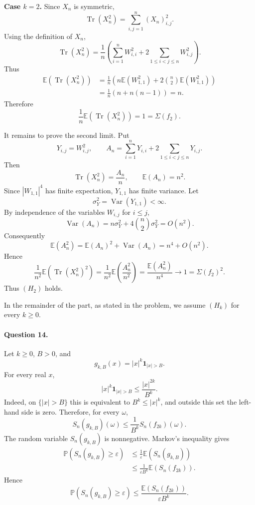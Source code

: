 \documentclass[11pt,a4paper]{article}
\newcommand{\E}{\mathbb{E}}
\newcommand{\Prob}{\mathbb{P}}
\newcommand{\one}{\mathbf{1}}
\DeclareMathOperator{\Tr}{Tr}
\begin{document}
\medskip
\noindent\textbf{Case $k=2$.}  Since $X_n$ is symmetric,
\[
  \Tr(X_n^2)=\sum_{i,j=1}^n (X_n)_{i,j}^2.
\]
Using the definition of $X_n$,
\[
  \Tr(X_n^2)
  =\frac1n\left(\sum_{i=1}^n W_{i,i}^2
  +2\sum_{1\le i<j\le n}W_{i,j}^2\right).
\]
Thus
\[
\begin{aligned}
 \E(\Tr(X_n^2))
 &=\frac1n\left(n\E(W_{1,1}^2)+2\binom n2\E(W_{1,1}^2)\right)\\
 &=\frac1n\left(n+n(n-1)\right)=n.
\end{aligned}
\]
Therefore
\[
  \frac1n\E(\Tr(X_n^2))=1=\Sigma(f_2).
\]

It remains to prove the second limit.  Put
\[
  Y_{i,j}=W_{i,j}^2,
  \qquad
  A_n=\sum_{i=1}^nY_{i,i}+2\sum_{1\le i<j\le n}Y_{i,j}.
\]
Then
\[
  \Tr(X_n^2)=\frac{A_n}{n},
  \qquad
  \E(A_n)=n^2.
\]
Since $|W_{1,1}|^4$ has finite expectation, $Y_{1,1}$ has finite variance.  Let
\[
  \sigma_Y^2=\operatorname{Var}(Y_{1,1})<\infty.
\]
By independence of the variables $W_{i,j}$ for $i\le j$,
\[
  \operatorname{Var}(A_n)
  =n\sigma_Y^2+4\binom n2\sigma_Y^2
  =O(n^2).
\]
Consequently
\[
  \E(A_n^2)=\E(A_n)^2+\operatorname{Var}(A_n)=n^4+O(n^2).
\]
Hence
\[
  \frac1{n^2}\E(\Tr(X_n^2)^2)
  =\frac1{n^2}\E\left(\frac{A_n^2}{n^2}\right)
  =\frac{\E(A_n^2)}{n^4}
  \longrightarrow1=\Sigma(f_2)^2.
\]
Thus $(H_2)$ holds.

In the remainder of the part, as stated in the problem, we assume $(H_k)$ for every $k\ge0$.

\paragraph{Question 14.}
Let $k\ge0$, $B>0$, and
\[
  g_{k,B}(x)=|x|^k\one_{|x|>B}.
\]
For every real $x$,
\[
  |x|^k\one_{|x|>B}
  \le \frac{|x|^{2k}}{B^k}.
\]
Indeed, on $\{|x|>B\}$ this is equivalent to $B^k\le |x|^k$, and outside this set the left-hand side is zero.  Therefore, for every $\omega$,
\[
  S_n(g_{k,B})(\omega)
  \le \frac1{B^k}S_n(f_{2k})(\omega).
\]
The random variable $S_n(g_{k,B})$ is nonnegative.  Markov's inequality gives
\[
\begin{aligned}
 \Prob(S_n(g_{k,B})\ge\varepsilon)
 &\le \frac1\varepsilon\E(S_n(g_{k,B}))\\
 &\le \frac1{\varepsilon B^k}\E(S_n(f_{2k})).
\end{aligned}
\]
Hence
\[
  \boxed{\Prob(S_n(g_{k,B})\ge\varepsilon)
  \le \frac{\E(S_n(f_{2k}))}{\varepsilon B^k}.}
\]
\end{document}
